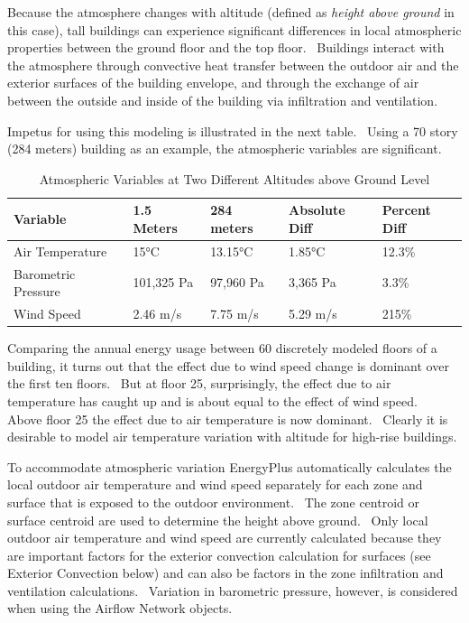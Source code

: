 Because the atmosphere changes with altitude (defined as \emph{height above ground} in this case), tall buildings can experience significant differences in local atmospheric properties between the ground floor and the top floor. ~Buildings interact with the atmosphere through convective heat transfer between the outdoor air and the exterior surfaces of the building envelope, and through the exchange of air between the outside and inside of the building via infiltration and ventilation.

Impetus for using this modeling is illustrated in the next table.~ Using a 70 story (284 meters) building as an example, the atmospheric variables are significant.

\begin{longtable}[c]{@{}lllll@{}}
\caption{Atmospheric Variables at Two Different Altitudes above Ground Level \label{table:atmospheric-variables-at-two-different}} \tabularnewline
\toprule
Variable & 1.5 Meters & 284 meters & Absolute Diff & Percent Diff \tabularnewline \midrule
\endhead

Air Temperature & 15°C & 13.15°C & 1.85°C & 12.3\% \tabularnewline
\nopagebreak Barometric Pressure & 101,325 Pa & 97,960 Pa & 3,365 Pa & 3.3\% \tabularnewline
\nopagebreak Wind Speed & 2.46 m/s & 7.75 m/s & 5.29 m/s & 215\% \tabularnewline
\bottomrule
\end{longtable}

Comparing the annual energy usage between 60 discretely modeled floors of a building, it turns out that the effect due to wind speed change is dominant over the first ten floors.~ But at floor 25, surprisingly, the effect due to air temperature has caught up and is about equal to the effect of wind speed.~ Above floor 25 the effect due to air temperature is now dominant.~ Clearly it is desirable to model air temperature variation with altitude for high-rise buildings.

To accommodate atmospheric variation EnergyPlus automatically calculates the local outdoor air temperature and wind speed separately for each zone and surface that is exposed to the outdoor environment.~ The zone centroid or surface centroid are used to determine the height above ground.~ Only local outdoor air temperature and wind speed are currently calculated because they are important factors for the exterior convection calculation for surfaces (see Exterior Convection below) and can also be factors in the zone infiltration and ventilation calculations.~ Variation in barometric pressure, however, is considered when using the Airflow Network objects.

